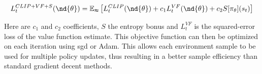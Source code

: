 \begin{equation}
  L_t^{CLIP+VF+S}(\nd{\theta}) = \mathbb{E_t} \left[ 
    L_t^{CLIP}(\nd{\theta}) +
    c_1L_t^{VF}(\nd{\theta}) +
    c_2S[\pi_\theta](s_t) 
    \right]
\end{equation}

Here are $c_1$ and $c_2$ coefficients, $S$ the entropy bonus and $L_t^{VF}$ is the squared-error loss of the value function estimate. This objective function can then be optimized on each iteration using \acrshort{sgd} or Adam. This allows each environment sample to be used for multiple policy updates, thus resulting in a better sample efficiency than standard gradient decent methods.





